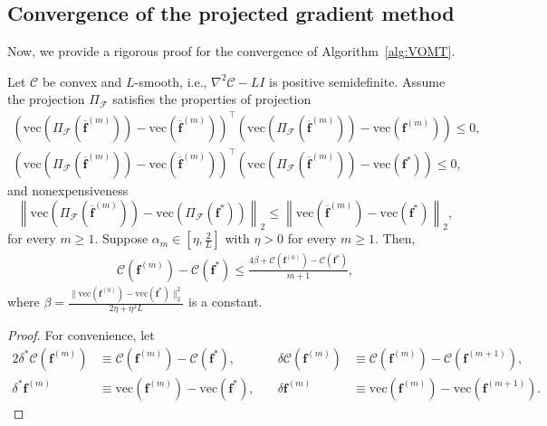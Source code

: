 \documentclass[onefignum,onetabnum]{siamonline220329}
\numberwithin{equation}{section}
\def\vec{{\mathrm{vec}}}
\def\f{\mathbf{f}}
\begin{document}
\begin{sloppypar}
\subsection{Convergence of the projected gradient method}

Now, we provide a rigorous proof for the convergence of Algorithm~\ref{alg:VOMT}.

\begin{theorem} \label{thm:ProjGrad}
Let $\mathcal{C}$ be convex and $L$-smooth, i.e., $\nabla^2 \mathcal{C} - L I$ is positive semidefinite.
Assume the projection $\Pi_\mathscr{F}$ satisfies the properties of projection
\begin{subequations}
\begin{align} 
\left( \vec( \Pi_\mathscr{F}(\overline{\f}^{(m)}) ) - \vec( \overline{\f}^{(m)} ) \right)^\top \left(  \vec( \Pi_\mathscr{F}(\overline{\f}^{(m)}) ) - \vec( \f^{(m)} ) \right) \leq 0, \label{eq:assumption2} \\
\left( \vec( \Pi_\mathscr{F}(\overline{\f}^{(m)}) ) - \vec( \overline{\f}^{(m)} ) \right)^\top \left(  \vec( \Pi_\mathscr{F}(\overline{\f}^{(m)}) ) - \vec( \f^{*} ) \right) \leq 0, \label{eq:assumption3}
\end{align}
\end{subequations}
and nonexpensiveness
\begin{equation} \label{eq:assumption1}
\left\|\vec( \Pi_\mathscr{F}(\overline{\f}^{(m)}) ) - \vec( \Pi_\mathscr{F}({\f}^{*}) )\right\|_2 \leq \left\|\vec( \overline{\f}^{(m)} ) - \vec( {\f}^{*} )\right\|_2,
\end{equation}
for every $m\geq 1$.
Suppose $\alpha_m \in [\eta,\frac{2}{L}]$ with $\eta>0$ for every $m\geq 1$.
Then,
\begin{align}
\mathcal{C}(\f^{(m)}) - \mathcal{C}(\f^{*}) \leq \frac{4\beta + \mathcal{C}(\f^{(0)}) - \mathcal{C}(\f^{*})}{m+1}, \label{eq:thm5.1}
\end{align}
where $\beta = \frac{\|\vec(\f^{(0)}) - \vec(\f^{*})\|_2^2}{2\eta+\eta^2 L}$ is a constant.
\end{theorem}
\begin{proof}
For convenience, let
\begin{alignat*}{2}
\delta^*\mathcal{C}(\f^{(m)}) &\equiv \mathcal{C}(\f^{(m)}) - \mathcal{C}(\f^{*}), &\quad
\delta\mathcal{C}(\f^{(m)}) &\equiv \mathcal{C}(\f^{(m)}) - \mathcal{C}(\f^{(m+1)}), \\
\delta^*\f^{(m)} &\equiv \vec(\f^{(m)}) - \vec(\f^{*}), & \quad
\delta\f^{(m)} &\equiv \vec(\f^{(m)}) - \vec(\f^{(m+1)}).

\end{alignat*}
\end{proof}
\end{sloppypar}
\end{document}
